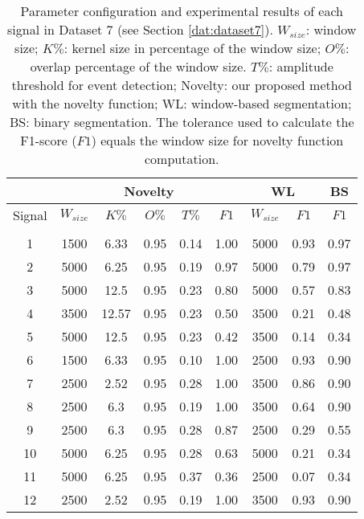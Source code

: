 \begin{table}[H]
    \caption{Parameter configuration and experimental results of each signal in Dataset 7 (see Section \ref{dat:dataset7}). $W_{size}$: window size; $K\%$: kernel size in percentage of the window size; $O\%$: overlap percentage of the window size. $T\%$: amplitude threshold for event detection; Novelty: our proposed method with the novelty function; WL: window-based segmentation; BS: binary segmentation. The tolerance used to calculate the F1-score ($F1$) equals the window size for novelty function computation.}
    \label{tab:params_results_3}
    \centering
    \begin{tabular}{ccccccccc}
    \toprule
    & \multicolumn{5}{c}{Novelty} & \multicolumn{2}{c}{WL} & BS\\
    \midrule
    Signal &     $W_{size}$ &     $K\%$ &     $O\%$ &   $T\%$    &     $F1$ & $W_{size}$ & $F1$ & $F1$\\
    \cmidrule(lr){2-6} \cmidrule(lr){7-8} \cmidrule(lr){9-9}\\
            1 & 1500 & 6.33 & 0.95 & 0.14 & 1.00 & 5000 & 0.93 & 0.97 \\ 
        2 & 5000 & 6.25 & 0.95 & 0.19 & 0.97 & 5000 & 0.79 & 0.97 \\ 
        3 & 5000 & 12.5 & 0.95 & 0.23 & 0.80 & 5000 & 0.57 & 0.83 \\ 
        4 & 3500 & 12.57 & 0.95 & 0.23 & 0.50 & 3500 & 0.21 & 0.48 \\ 
        5 & 5000 & 12.5 & 0.95 & 0.23 & 0.42 & 3500 & 0.14 & 0.34 \\ 
        6 & 1500 & 6.33 & 0.95 & 0.10 & 1.00 & 2500 & 0.93 & 0.90 \\ 
        7 & 2500 & 2.52 & 0.95 & 0.28 & 1.00 & 3500 & 0.86 & 0.90 \\ 
        8 & 2500 & 6.3 & 0.95 & 0.19 & 1.00 & 3500 & 0.64 & 0.90 \\ 
        9 & 2500 & 6.3 & 0.95 & 0.28 & 0.87 & 2500 & 0.29 & 0.55 \\ 
        10 & 5000 & 6.25 & 0.95 & 0.28 & 0.63 & 5000 & 0.21 & 0.34 \\ 
        11 & 5000 & 6.25 & 0.95 & 0.37 & 0.36 & 2500 & 0.07 & 0.34 \\ 
        12 & 2500 & 2.52 & 0.95 & 0.19 & 1.00 & 3500 & 0.93 & 0.90 \\ 
    \bottomrule
    \end{tabular}
\end{table}


